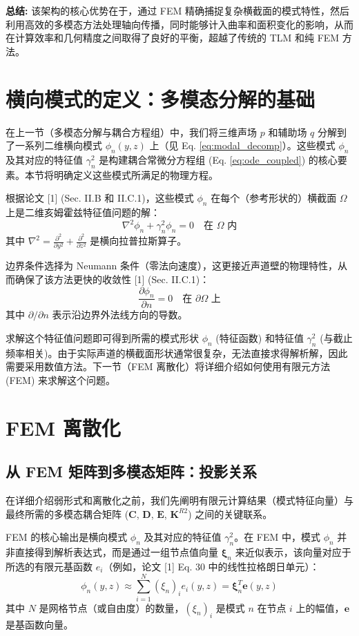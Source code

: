 \documentclass{ctexart}
\begin{document}
\textbf{总结:} 该架构的核心优势在于，通过 FEM 精确捕捉复杂横截面的模式特性，然后利用高效的多模态方法处理轴向传播，同时能够计入曲率和面积变化的影响，从而在计算效率和几何精度之间取得了良好的平衡，超越了传统的 TLM 和纯 FEM 方法。

\section{横向模式的定义：多模态分解的基础}
在上一节（多模态分解与耦合方程组）中，我们将三维声场 $p$ 和辅助场 $q$ 分解到了一系列二维横向模式 $\phi_n(y,z)$ 上（见 Eq. \eqref{eq:modal_decomp}）。这些模式 $\phi_n$ 及其对应的特征值 $\gamma_n^2$ 是构建耦合常微分方程组 (Eq. \eqref{eq:ode_coupled}) 的核心要素。本节将明确定义这些模式所满足的物理方程。

根据论文 [1] (Sec. II.B 和 II.C.1)，这些模式 $\phi_n$ 在每个（参考形状的）横截面 $\Omega$ 上是二维亥姆霍兹特征值问题的解：
\[
\nabla^2 \phi_n + \gamma_n^2 \phi_n = 0 \quad \text{在 } \Omega \text{ 内}
\]
其中 $\nabla^2 = \frac{\partial^2}{\partial y^2} + \frac{\partial^2}{\partial z^2}$ 是横向拉普拉斯算子。

边界条件选择为 Neumann 条件（零法向速度），这更接近声道壁的物理特性，从而确保了该方法更快的收敛性 [1] (Sec. II.C.1)：
\[
\frac{\partial \phi_n}{\partial n} = 0 \quad \text{在 } \partial\Omega \text{ 上}
\]
其中 $\partial/\partial n$ 表示沿边界外法线方向的导数。

求解这个特征值问题即可得到所需的模式形状 $\phi_n$ (特征函数) 和特征值 $\gamma_n^2$ (与截止频率相关)。由于实际声道的横截面形状通常很复杂，无法直接求得解析解，因此需要采用数值方法。下一节（FEM 离散化）将详细介绍如何使用有限元方法 (FEM) 来求解这个问题。

\section{FEM 离散化}
\subsection{从 FEM 矩阵到多模态矩阵：投影关系}
在详细介绍弱形式和离散化之前，我们先阐明有限元计算结果（模式特征向量）与最终所需的多模态耦合矩阵 ($\mathbf{C}$, $\mathbf{D}$, $\mathbf{E}$, $\mathbf{K}^{R2}$) 之间的关键联系。

FEM 的核心输出是横向模式 $\phi_n$ 及其对应的特征值 $\gamma_n^2$。在 FEM 中，模式 $\phi_n$ 并非直接得到解析表达式，而是通过一组节点值向量 $\boldsymbol{\xi}_n$ 来近似表示，该向量对应于所选的有限元基函数 $e_i$（例如，论文 [1] Eq. 30 中的线性拉格朗日单元）：
\[
\phi_n(y,z) \approx \sum_{i=1}^{N} (\xi_n)_i e_i(y,z) = \boldsymbol{\xi}_n^T \mathbf{e}(y,z)
\]
其中 $N$ 是网格节点（或自由度）的数量，$(\xi_n)_i$ 是模式 $n$ 在节点 $i$ 上的幅值，$\mathbf{e}$ 是基函数向量。
\end{document}
